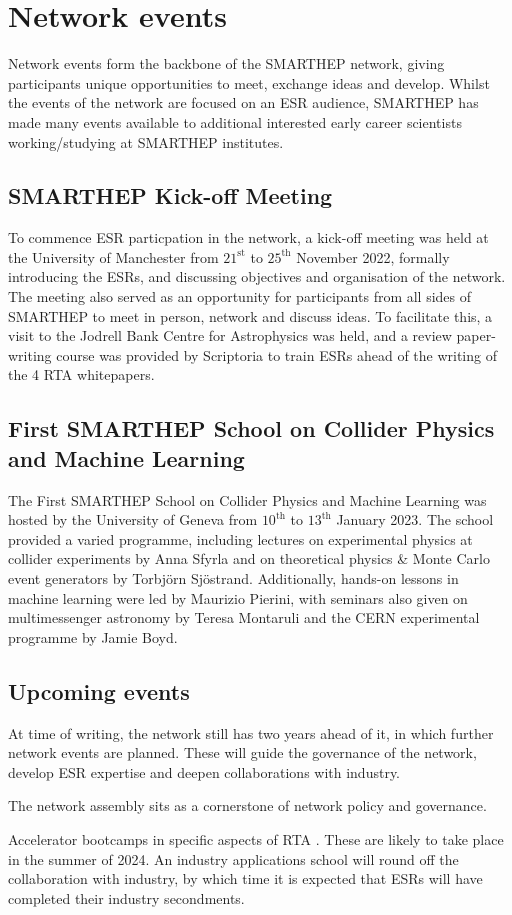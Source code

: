 \section{Network events}
\label{events}
Network events form the backbone of the SMARTHEP network, giving participants unique opportunities to meet, exchange ideas and develop. Whilst the events of the network are focused on an ESR audience, SMARTHEP has made many events available to additional interested early career scientists working/studying at SMARTHEP institutes.

\subsection{SMARTHEP Kick-off Meeting}
\label{kick-off}
To commence ESR particpation in the network, a kick-off meeting was held at the University of Manchester from ${21}^\text{st}$ to ${25}^\text{th}$ November 2022, formally introducing the ESRs, and discussing objectives and organisation of the network. The meeting also served as an opportunity for participants from all sides of SMARTHEP to meet in person, network and discuss ideas. To facilitate this, a visit to the Jodrell Bank Centre for Astrophysics was held, and a review paper-writing course was provided by Scriptoria to train ESRs ahead of the writing of the 4 RTA whitepapers.


\subsection{First SMARTHEP School on Collider Physics and Machine Learning}
\label{unige-school}
The First SMARTHEP School on Collider Physics and Machine Learning was hosted by the University of Geneva from ${10}^\text{th}$ to ${13}^\text{th}$ January 2023. The school provided a varied programme, including lectures on experimental physics at collider experiments by Anna Sfyrla and on theoretical physics \& Monte Carlo event generators by Torbj\"orn Sj\"ostrand. Additionally, hands-on lessons in machine learning were led by Maurizio Pierini, with seminars also given on multimessenger astronomy by Teresa Montaruli and the CERN experimental programme by Jamie Boyd.

\subsection{Upcoming events}
\label{upcoming}
At time of writing, the network still has two years ahead of it, in which further network events are planned. These will guide the governance of the network, develop ESR expertise and deepen collaborations with industry.\par
The network assembly sits as a cornerstone of network policy and governance.\par
Accelerator bootcamps in specific aspects of RTA . These are likely to take place in the summer of 2024. An industry applications school will round off the collaboration with industry, by which time it is expected that ESRs will have completed their industry secondments.

